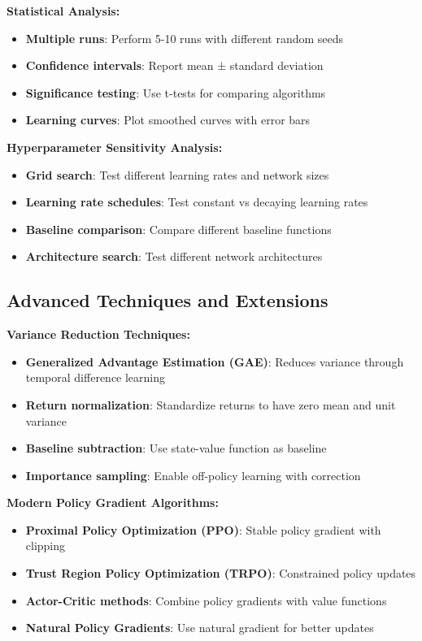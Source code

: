 \documentclass[12pt]{article}
\begin{document}
{{{\textbf{Statistical Analysis:}
\begin{itemize}
    \item \textbf{Multiple runs}: Perform 5-10 runs with different random seeds
    \item \textbf{Confidence intervals}: Report mean ± standard deviation
    \item \textbf{Significance testing}: Use t-tests for comparing algorithms
    \item \textbf{Learning curves}: Plot smoothed curves with error bars
\end{itemize}

\textbf{Hyperparameter Sensitivity Analysis:}
\begin{itemize}
    \item \textbf{Grid search}: Test different learning rates and network sizes
    \item \textbf{Learning rate schedules}: Test constant vs decaying learning rates
    \item \textbf{Baseline comparison}: Compare different baseline functions
    \item \textbf{Architecture search}: Test different network architectures
\end{itemize}

\subsection{Advanced Techniques and Extensions}

\textbf{Variance Reduction Techniques:}
\begin{itemize}
    \item \textbf{Generalized Advantage Estimation (GAE)}: Reduces variance through temporal difference learning
    \item \textbf{Return normalization}: Standardize returns to have zero mean and unit variance
    \item \textbf{Baseline subtraction}: Use state-value function as baseline
    \item \textbf{Importance sampling}: Enable off-policy learning with correction
\end{itemize}

\textbf{Modern Policy Gradient Algorithms:}
\begin{itemize}
    \item \textbf{Proximal Policy Optimization (PPO)}: Stable policy gradient with clipping
    \item \textbf{Trust Region Policy Optimization (TRPO)}: Constrained policy updates
    \item \textbf{Actor-Critic methods}: Combine policy gradients with value functions
    \item \textbf{Natural Policy Gradients}: Use natural gradient for better updates
\end{itemize}

}}}
\end{document}
